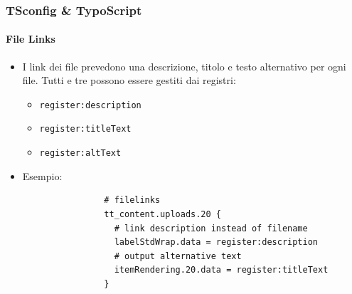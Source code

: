\begin{frame}[fragile]
\begin{columns}[T]
	\end{columns}

\end{frame}


\begin{frame}[fragile]
	\frametitle{TSconfig \& TypoScript}
	\framesubtitle{File Links}

	\begin{itemize}
		\item I link dei file prevedono una descrizione, titolo e testo alternativo per ogni file.
			Tutti e tre possono essere gestiti dai registri:

			\begin{itemize}
				\item \texttt{register:description}
				\item \texttt{register:titleText}
				\item \texttt{register:altText}
			\end{itemize}

		\item Esempio:

			\begin{lstlisting}
				# filelinks
				tt_content.uploads.20 {
				  # link description instead of filename
				  labelStdWrap.data = register:description
				  # output alternative text
				  itemRendering.20.data = register:titleText
				}
			\end{lstlisting}

	\end{itemize}

\end{frame}


